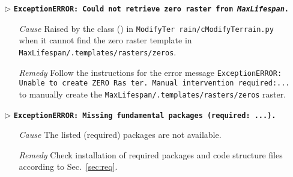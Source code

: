\begin{itemize}
	\item[$\triangleright$]\textbf{\texttt{ExceptionERROR: Could not retrieve zero raster from \textit{MaxLifespan}.}}
	\begin{itemize}
		\item[\textit{Cause}\hspace{0.27cm}] Raised by the  class () in \texttt{ModifyTer rain/cModifyTerrain.py} when it cannot find the zero raster template in \texttt{MaxLifespan/.templates/rasters/zeros}.
		\item[\textit{Remedy}] Follow the instructions for the error message \texttt{ExceptionERROR: Unable to create ZERO Ras ter. Manual intervention required:...} to manually create the \texttt{MaxLifespan/.templates/rasters/zeros} raster.\\
	\end{itemize}
	
	\item[$\triangleright$]\textbf{\texttt{ExceptionERROR: Missing fundamental packages (required: ...).}}
	\begin{itemize}
		\item[\textit{Cause}\hspace{0.27cm}] The listed (required) packages are not available.
		\item[\textit{Remedy}] Check installation of required packages and code structure files according to Sec.~\ref{sec:req}.\\
	\end{itemize}
	

\end{itemize}
